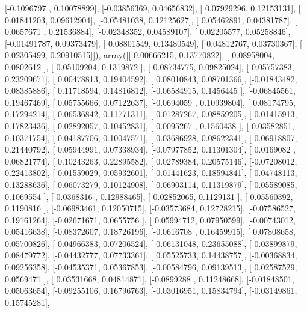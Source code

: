 \documentclass{article}
\begin{document}
       [-0.1096797 ,  0.10078899],
       [-0.03856369,  0.04656832],
       [ 0.07929296,  0.12153131],
       [ 0.01841203,  0.09612904],
       [-0.05481038,  0.12125627],
       [ 0.05462891,  0.04381787],
       [ 0.0657671 ,  0.21536884],
       [-0.02348352,  0.04589107],
       [ 0.02205577,  0.05258846],
       [-0.01491787,  0.09373479],
       [ 0.08801549,  0.13480549],
       [ 0.04812767,  0.03730367],
       [ 0.02305499,  0.20910515]]), array([[-0.00666215,  0.13770822],
       [ 0.08958004,  0.0802612 ],
       [ 0.05109204,  0.1319872 ],
       [ 0.08734775,  0.09825024],
       [-0.05757383,  0.23209671],
       [ 0.00478813,  0.19404592],
       [ 0.08010843,  0.08701366],
       [-0.01843482,  0.08385886],
       [ 0.11718594,  0.14816812],
       [-0.06584915,  0.1456445 ],
       [-0.06845561,  0.19467469],
       [ 0.05755666,  0.07122637],
       [-0.0694059 ,  0.10939804],
       [ 0.08174795,  0.17294214],
       [-0.06536842,  0.11771311],
       [-0.01287267,  0.08859205],
       [ 0.01415913,  0.17823436],
       [-0.02892057,  0.10452831],
       [-0.0095267 ,  0.1560438 ],
       [ 0.03582851,  0.10371754],
       [-0.04187706,  0.10047571],
       [-0.03686928,  0.08622341],
       [-0.06918807,  0.21440792],
       [ 0.05944991,  0.07338934],
       [-0.07977852,  0.11301304],
       [ 0.0169082 ,  0.06821774],
       [ 0.10243263,  0.22895582],
       [ 0.02789384,  0.20575146],
       [-0.07208012,  0.22413802],
       [-0.01559029,  0.05932601],
       [-0.01441623,  0.18594841],
       [ 0.04748113,  0.13288636],
       [ 0.06073279,  0.10124908],
       [ 0.06903114,  0.11319879],
       [ 0.05589085,  0.1069554 ],
       [ 0.0368316 ,  0.12988465],
       [-0.02852065,  0.1129131 ],
       [ 0.05560392,  0.1190816 ],
       [-0.06983461,  0.12050715],
       [-0.03573684,  0.12728215],
       [-0.07586527,  0.19161264],
       [-0.02671671,  0.0655756 ],
       [ 0.05994712,  0.07950599],
       [-0.00743012,  0.05416638],
       [-0.08372607,  0.18726196],
       [-0.0616708 ,  0.16459915],
       [ 0.07808658,  0.05700826],
       [ 0.04966383,  0.07206524],
       [-0.06131048,  0.23655088],
       [-0.03899879,  0.08479772],
       [-0.04432777,  0.07733361],
       [ 0.05525733,  0.14438757],
       [-0.00368834,  0.09256358],
       [-0.04535371,  0.05367853],
       [-0.00584796,  0.09139513],
       [ 0.02587529,  0.0569471 ],
       [ 0.03531668,  0.04814871],
       [-0.0899288 ,  0.11248668],
       [-0.01848501,  0.05063654],
       [-0.09255106,  0.16796763],
       [-0.03016951,  0.15834794],
       [-0.03149861,  0.15745281],
\end{document}

